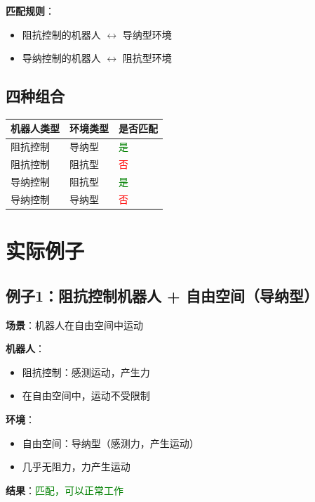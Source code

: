 \documentclass[12pt,a4paper]{article}
\begin{document}
\textbf{匹配规则}：
\begin{itemize}
\item 阻抗控制的机器人 $\leftrightarrow$ 导纳型环境
\item 导纳控制的机器人 $\leftrightarrow$ 阻抗型环境
\end{itemize}

\subsection{四种组合}

\begin{center}
\begin{tabular}{|l|l|l|}
\hline
\textbf{机器人类型} & \textbf{环境类型} & \textbf{是否匹配} \\
\hline
阻抗控制 & 导纳型 & \textcolor{green}{是} \\
\hline
阻抗控制 & 阻抗型 & \textcolor{red}{否} \\
\hline
导纳控制 & 阻抗型 & \textcolor{green}{是} \\
\hline
导纳控制 & 导纳型 & \textcolor{red}{否} \\
\hline
\end{tabular}
\end{center}

\section{实际例子}

\subsection{例子1：阻抗控制机器人 + 自由空间（导纳型）}

\textbf{场景}：机器人在自由空间中运动

\textbf{机器人}：
\begin{itemize}
\item 阻抗控制：感测运动，产生力
\item 在自由空间中，运动不受限制
\end{itemize}

\textbf{环境}：
\begin{itemize}
\item 自由空间：导纳型（感测力，产生运动）
\item 几乎无阻力，力产生运动
\end{itemize}

\textbf{结果}：\textcolor{green}{匹配，可以正常工作}
\end{document}
